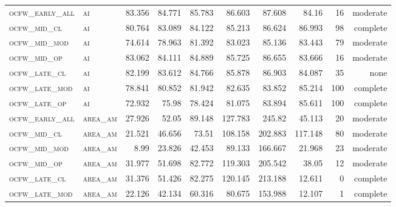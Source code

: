 \begin{landscape}
\begin{center}
\begin{footnotesize}
\begin{longtable}{llrrrrr|rrr}
\textsc{ocfw\_early\_all} & \textsc{ai        }    & 83.356   & 84.771   & 85.783   & 86.603   & 87.608     & 84.16         & 16            & moderate        \\
\textsc{ocfw\_mid\_cl   } & \textsc{ai        }    & 80.764   & 83.089   & 84.122   & 85.213   & 86.624     & 86.993        & 98            & complete        \\
\textsc{ocfw\_mid\_mod  } & \textsc{ai        }    & 74.614   & 78.963   & 81.392   & 83.023   & 85.136     & 83.443        & 79            & moderate        \\
\textsc{ocfw\_mid\_op   } & \textsc{ai        }    & 83.062   & 84.111   & 84.889   & 85.725   & 86.655     & 83.666        & 16            & moderate        \\
\textsc{ocfw\_late\_cl  } & \textsc{ai        }    & 82.199   & 83.612   & 84.766   & 85.878   & 86.903     & 84.087        & 35            & none        \\
\textsc{ocfw\_late\_mod } & \textsc{ai        }    & 78.841   & 80.852   & 81.942   & 82.635   & 83.852     & 85.214        & 100           & complete             \\
\textsc{ocfw\_late\_op  } & \textsc{ai        }    & 72.932   & 75.98    & 78.424   & 81.075   & 83.894     & 85.611        & 100           & complete             \\
\textsc{ocfw\_early\_all} & \textsc{area\_am  }    & 27.926   & 52.05    & 89.148   & 127.783  & 245.82     & 45.113        & 20            & moderate        \\
\textsc{ocfw\_mid\_cl   } & \textsc{area\_am  }    & 21.521   & 46.656   & 73.51    & 108.158  & 202.883    & 117.148       & 80            & moderate        \\
\textsc{ocfw\_mid\_mod  } & \textsc{area\_am  }    & 8.99     & 23.826   & 42.453   & 89.133   & 166.667    & 21.968        & 23            & moderate        \\
\textsc{ocfw\_mid\_op   } & \textsc{area\_am  }    & 31.977   & 51.698   & 82.772   & 119.303  & 205.542    & 38.05         & 12            & moderate        \\
\textsc{ocfw\_late\_cl  } & \textsc{area\_am  }    & 31.376   & 51.426   & 82.275   & 120.145  & 213.188    & 12.611        & 0             & complete            \\
\textsc{ocfw\_late\_mod } & \textsc{area\_am  }    & 22.126   & 42.134   & 60.316   & 80.675   & 153.988    & 12.107        & 1             & complete        \\

\end{longtable}
\end{footnotesize}
\end{center}
\end{landscape}
